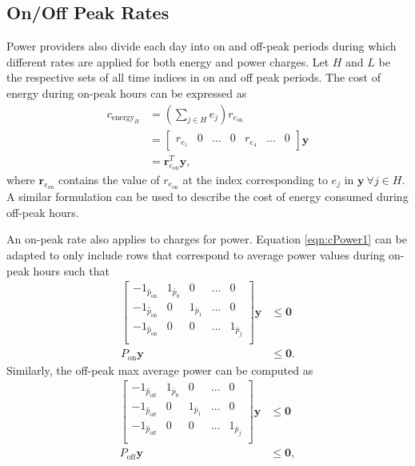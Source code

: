 \subsection{On/Off Peak Rates}
Power providers also divide each day into on and off-peak periods during which different rates are applied for both energy and power charges. Let $H$ and $L$ be the respective sets of all time indices in on and off peak periods. The cost of energy during on-peak hours can be expressed as 
\begin{equation}\label{eqn:cEnergy1}
	\begin{aligned}
		c_{\text{energy}_H} &= \left ( \sum_{j\in H} e_j \right ) r_{e_\text{on}} \\
		&= \begin{bmatrix}r_{e_1} & 0 & \hdots & 0 & r_{e_4} & \hdots & 0 \end{bmatrix}\mathbf{y} \\
		&= \mathbf{r}_{e_\text{on}}^T\mathbf{y},
	\end{aligned}
\end{equation}
where $\mathbf{r}_{e_\text{on}}$ contains the value of $r_{e_\text{on}}$ at the index corresponding to $e_j$ in $\mathbf{y} \ \forall j \in H$. A similar formulation can be used to describe the cost of energy consumed during off-peak hours.  
\par An on-peak rate also applies to charges for power. Equation \ref{eqn:cPower1} can be adapted to only include rows that correspond to average power values during on-peak hours such that
\begin{equation}\label{eqn:cPOnPeak} 
	\begin{aligned}
		 \begin{bmatrix} 
			 -1_{\hat{p}_\text{on}} & 1_{\bar{p}_0} & 0             & \hdots & 0 \\ 
			 -1_{\hat{p}_\text{on}} & 0       & 1_{\bar{p}_1} & \hdots & 0\\
			 -1_{\hat{p}_\text{on}} & 0       & 0 & \hdots    & 1_{\bar{p}_j} \\
		 \end{bmatrix}\mathbf{y} &\le \mathbf{0} \\ 
		 P_{\text{on}}\mathbf{y} &\le \mathbf{0}.  
	\end{aligned}
\end{equation}
Similarly, the off-peak max average power can be computed as  
\begin{equation}\label{eqn:cPOffPeak}
	\begin{aligned}
		 \begin{bmatrix} 
			 -1_{\hat{p}_\text{off}} & 1_{\bar{p}_0} & 0             & \hdots & 0 \\ 
			 -1_{\hat{p}_\text{off}} & 0       & 1_{\bar{p}_1} & \hdots & 0\\
			 -1_{\hat{p}_\text{off}} & 0       & 0 & \hdots    & 1_{\bar{p}_j} \\
		 \end{bmatrix}\mathbf{y} &\le \mathbf{0} \\ 
		 P_{\text{off}}\mathbf{y} &\le \mathbf{0},  
	\end{aligned}
\end{equation}
